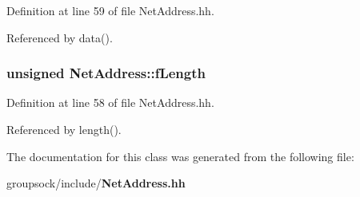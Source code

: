 Definition at line 59 of file Net\+Address.\+hh.



Referenced by data().

\subsubsection[{f\+Length}]{\setlength{\rightskip}{0pt plus 5cm}unsigned Net\+Address\+::f\+Length\hspace{0.3cm}{\ttfamily [private]}}\label{classNetAddress_ad211f7732107ede076a87b38bf344136}


Definition at line 58 of file Net\+Address.\+hh.



Referenced by length().



The documentation for this class was generated from the following file\+:\begin{DoxyCompactItemize}
\item 
groupsock/include/{\bf Net\+Address.\+hh}\end{DoxyCompactItemize}
